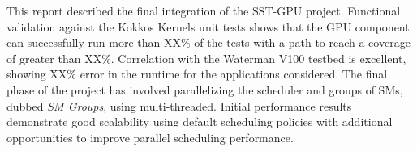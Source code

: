 This report described the final integration of the SST-GPU project.
Functional validation against the Kokkos Kernels unit tests shows that the GPU
component can successfully run more than XX\% of the tests with a path to reach
a coverage of greater than XX\%. Correlation with the Waterman V100 testbed is
excellent, showing XX\% error in the runtime for the applications considered.
The final phase of the project has involved parallelizing the scheduler and
groups of SMs, dubbed {\em SM Groups}, using multi-threaded.
Initial performance results demonstrate good scalability
using default scheduling policies with additional opportunities to improve
parallel scheduling performance.

